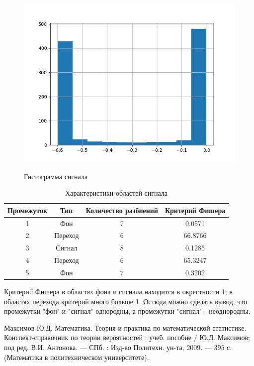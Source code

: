 \documentclass[12pt,a4paper]{article}
\begin{document}
	\begin{figure}[hpt]
		{\includegraphics[width=1\linewidth]{../plots/hist.png}}
		\caption{Гистограмма сигнала}
	\end{figure}
	\FloatBarrier
	\newpage
	\begin{table}[hpt]
		\begin{center}
			\begin{tabular}{|c|c|c|c|}
				\hline
				Промежуток & Тип & Количество разбиений & Критерий Фишера \\ \hline
				1 & Фон & 7 & 0.0571 \\ \hline
				2 & Переход & 6 & 66.8766\\ \hline
				3 & Сигнал & 8 & 0.1285 \\ \hline
				4 & Переход & 6 & 65.3247 \\ \hline
				5 & Фон & 7 & 0.3202 \\ \hline
			\end{tabular}
		\end{center}
	\caption{Характеристики областей сигнала}
	\end{table}
	\FloatBarrier
	
	Критерий Фишера в областях фона и сигнала находится в окрестности 1; в областях перехода критерий много больше 1. Остюда можно сделать вывод, что промежутки "фон" и "сигнал" однородны, а промежутки "сигнал" - неоднородны.

	
	\clearpage
	\newpage	
	\begin{thebibliography}{1}
		  Максимов Ю.Д. Математика. Теория и практика по математической статистике. Конспект-справочник по теории вероятностей : учеб. пособие /
		Ю.Д. Максимов; под ред. В.И. Антонова. — СПб. : Изд-во Политехн.
		ун-та, 2009. — 395 с. (Математика в политехническом университете).
		
	\end{thebibliography}
\end{document}
